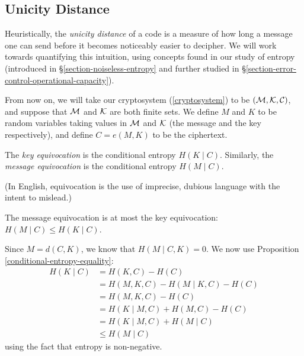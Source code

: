 \documentclass{article}
\begin{document}

\subsection{Unicity Distance}
\label{section-cryptography-unicity-distance}

Heuristically, the \textit{unicity distance} of a code is a measure of how long a message one can send before it becomes noticeably easier to decipher. We will work towards quantifying this intuition, using concepts found in our study of entropy (introduced in \S\ref{section-noiseless-entropy} and further studied in \S\ref{section-error-control-operational-capacity}).

From now on, we will take our cryptosystem (\ref{cryptosystem}) to be $(\mathcal{M}, \mathcal{K}, \mathcal{C})$, and suppose that $\mathcal{M}$ and $\mathcal{K}$ are both finite sets. We define $M$ and $K$ to be random variables taking values in $\mathcal{M}$ and $\mathcal{K}$ (the message and the key respectively), and define $C = e(M, K)$ to be the ciphertext.

\begin{definition}[Equivocation]
    The \textit{key equivocation} is the conditional entropy $H(K \mid C)$. Similarly, the \textit{message equivocation} is the conditional entropy $H(M \mid C)$.
    
    (In English, equivocation is the use of imprecise, dubious language with the intent to mislead.)
\end{definition}


\begin{proposition}
    The message equivocation is at most the key equivocation: $H(M \mid C) \leq H(K \mid C)$.
\end{proposition}

\begin{prf}
    Since $M = d(C, K)$, we know that $H(M \mid C, K) = 0$. We now use Proposition \ref{conditional-entropy-equality}:
    \begin{align*}
		H(K \mid C) &= H(K, C) - H(C) \\
		&= H(M, K, C) - H(M \mid K, C) - H(C) \\
		&= H(M, K, C) - H(C) \\
		&= H(K \mid M, C) + H(M, C) - H(C) \\
		&= H(K \mid M, C) + H(M \mid C) \\
		&\leq H(M \mid C)
	\end{align*}
	using the fact that entropy is non-negative.
\end{prf}
\end{document}
